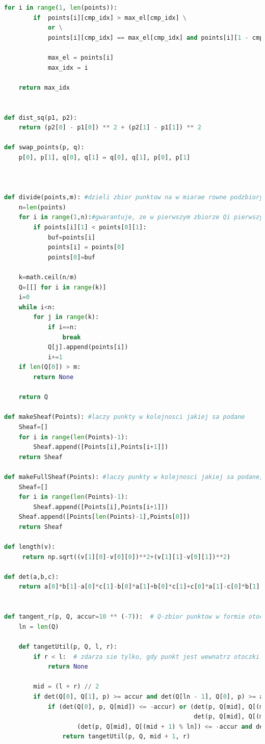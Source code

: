 \documentclass[11pt]{article}
\theoremstyle{remark} \newtheorem{definition}{def.}
\theoremstyle{definition} \newtheorem{twierdzenie}{tw.}
\begin{document}
\begin{lstlisting}[language=Python]
    for i in range(1, len(points)):
        if  points[i][cmp_idx] > max_el[cmp_idx] \
            or \
            points[i][cmp_idx] == max_el[cmp_idx] and points[i][1 - cmp_idx] > max_el[1 - cmp_idx]:
                
            max_el = points[i]
            max_idx = i
            
    return max_idx


def dist_sq(p1, p2):
    return (p2[0] - p1[0]) ** 2 + (p2[1] - p1[1]) ** 2

def swap_points(p, q):
    p[0], p[1], q[0], q[1] = q[0], q[1], p[0], p[1]

    
    
def divide(points,m): #dzieli zbior punktow na w miarae rowne podzbiory o rozmiarze m lub m-1
    n=len(points)
    for i in range(1,n):#gwarantuje, ze w pierwszym zbiorze Qi pierwszy element jest najnizszy, czyli nalezy do otoczki ostatecznej
        if points[i][1] < points[0][1]:
            buf=points[i]
            points[i] = points[0]
            points[0]=buf
            
    k=math.ceil(n/m)
    Q=[[] for i in range(k)]
    i=0
    while i<n:
        for j in range(k):
            if i==n:
                break
            Q[j].append(points[i])
            i+=1
    if len(Q[0]) > m:
        return None
            
    return Q

def makeSheaf(Points): #laczy punkty w kolejnosci jakiej sa podane
    Sheaf=[]
    for i in range(len(Points)-1):
        Sheaf.append([Points[i],Points[i+1]])
    return Sheaf

def makeFullSheaf(Points): #laczy punkty w kolejnosci jakiej sa podane, dodatkowo domyka cylk
    Sheaf=[]
    for i in range(len(Points)-1):
        Sheaf.append([Points[i],Points[i+1]])
    Sheaf.append([Points[len(Points)-1],Points[0]])
    return Sheaf

def length(v):
     return np.sqrt((v[1][0]-v[0][0])**2+(v[1][1]-v[0][1])**2)

def det(a,b,c):
    return a[0]*b[1]-a[0]*c[1]-b[0]*a[1]+b[0]*c[1]+c[0]*a[1]-c[0]*b[1]


def tangent_r(p, Q, accur=10 ** (-7)):  # Q-zbior punktow w formie otoczki
    ln = len(Q)

    def tangetUtil(p, Q, l, r):
        if r < l:  # zdarza sie tylko, gdy punkt jest wewnatrz otoczki
            return None

        mid = (l + r) // 2
        if det(Q[0], Q[1], p) >= accur and det(Q[ln - 1], Q[0], p) >= accur:
            if (det(Q[0], p, Q[mid]) <= -accur) or (det(p, Q[mid], Q[(mid + 1) % ln]) <= -accur and \
                                                    det(p, Q[mid], Q[(mid - 1) % ln]) <= -accur) or \
                    (det(p, Q[mid], Q[(mid + 1) % ln]) <= -accur and det(p, Q[mid], Q[(mid - 1) % ln]) > -accur):
                return tangetUtil(p, Q, mid + 1, r)


\end{lstlisting}
\end{document}
